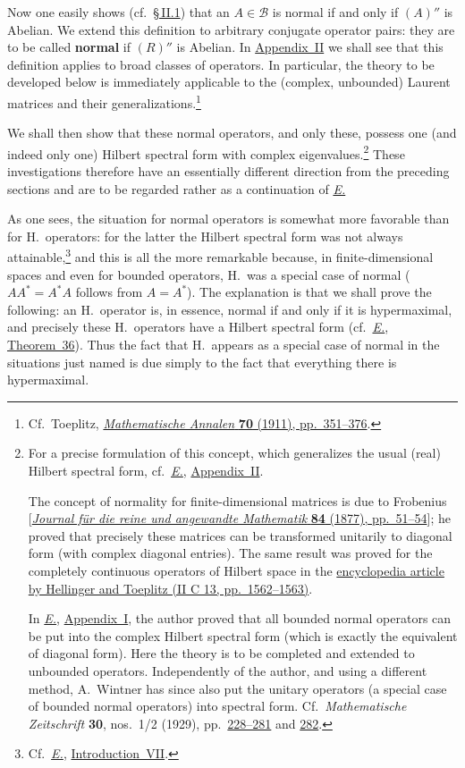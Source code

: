 \documentclass[
  paper=b5,
  twoside=true,
  fontsize=13pt,
  headings=normal,
  bookmarkpackage=false
]{scrartcl}
\theoremstyle{definition}
\newcommand{\Eref}{\hyperref[fn:E-paper]{\emph{E.}}}
\newcommand{\ErefText}[1]{\href{https://doi.org/10.1007/BF01782338}{#1}}
\begin{document}
Now one easily shows (cf.\
\hyperref[sec:ring-and-commutant-1]{\S\,II.1}) that an
\(A\in\mathcal B\) is normal if
and only if $(A)''$ is Abelian. We extend this definition to arbitrary
conjugate operator pairs: they are to be called \textbf{normal} if $(R)''$ is
Abelian. In \hyperref[app:laurent-matrices]{Appendix~II} we shall see that this definition applies to broad
classes of operators. In particular, the theory to be developed below is
immediately applicable to the (complex, unbounded) Laurent matrices and
their generalizations.\footnote{\label{fn:24}Cf.\ Toeplitz, \href{https://doi.org/10.1007/BF01564502}{\emph{Mathematische Annalen}
\textbf{70} (1911), pp.~351--376}.}

We shall then show that these normal operators, and only these, possess one
(and indeed only one) Hilbert spectral form with complex
eigenvalues.\footnote{\label{fn:25}\label{fn:normal-spectral-form}For a precise
formulation of this concept, which generalizes the usual (real) Hilbert
spectral form, cf.\ \Eref, \ErefText{Appendix~II}.

The concept of normality for finite-dimensional matrices is due to
Frobenius [\href{https://doi.org/10.1515/crelle-1878-18788403}{\emph{Journal f\"ur die reine und angewandte Mathematik}
\textbf{84} (1877), pp.~51--54}]; he proved that precisely these matrices can
be transformed unitarily to diagonal form (with complex diagonal entries).
The same result was proved for the completely continuous operators of
Hilbert space in the \href{https://doi.org/10.1007/978-3-663-15917-9}{encyclopedia article by Hellinger and Toeplitz (II C 13, pp.~1562--1563)}.

In \Eref, \ErefText{Appendix~I}, the author proved that all bounded normal operators can
be put into the complex Hilbert spectral form (which is exactly the
equivalent of diagonal form). Here the theory is to be completed and
extended to unbounded operators. Independently of the author, and using a
different method, A.~Wintner has since also put the unitary operators (a
special case of bounded normal operators) into spectral form. Cf.\
\emph{Mathematische Zeitschrift} \textbf{30}, nos.~1/2 (1929),
pp.~\href{https://doi.org/10.1007/BF01187766}{228--281} and
\href{https://doi.org/10.1007/BF01187767}{282}.} These investigations therefore have an essentially
different direction from the preceding sections and are to be regarded
rather as a continuation of \Eref

As one sees, the situation for normal operators is somewhat more favorable
than for H.\ operators: for the latter the Hilbert spectral form was not
always attainable,\footnote{\label{fn:26}Cf.\ \Eref, \ErefText{Introduction~VII}.} and this is all the
more remarkable because, in finite-dimensional spaces and even for bounded
operators, H.\ was a special case of normal
($AA^*=A^*A$ follows from $A=A^*$). The explanation is that we shall prove
the following: an H.\ operator is, in essence, normal if and only if it is
hypermaximal, and precisely these H.\ operators have a Hilbert spectral form
(cf.\ \Eref, \ErefText{Theorem~36}). Thus the fact that H.\ appears as a special case of
normal in the situations just named is due simply to the fact that
everything there is hypermaximal.
\end{document}

